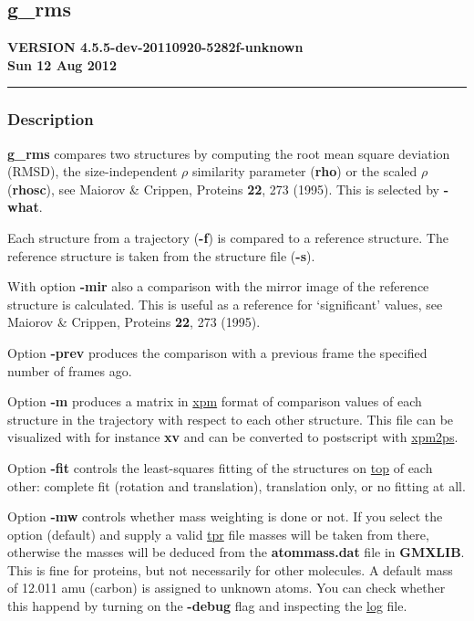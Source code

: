 \documentclass[]{article}
\author{}
\date{}
\begin{document}
\subsection{g\_rms}

\textbf{VERSION 4.5.5-dev-20110920-5282f-unknown\\ Sun 12 Aug 2012}

\begin{center}\rule{3in}{0.4pt}\end{center}

\subsubsection{Description}

\textbf{g\_rms} compares two structures by computing the root mean
square deviation (RMSD), the size-independent $\rho$ similarity
parameter (\textbf{rho}) or the scaled $\rho$ (\textbf{rhosc}), see
Maiorov \& Crippen, Proteins \textbf{22}, 273 (1995). This is selected
by \textbf{-what}.

Each structure from a trajectory (\textbf{-f}) is compared to a
reference structure. The reference structure is taken from the structure
file (\textbf{-s}).

With option \textbf{-mir} also a comparison with the mirror image of the
reference structure is calculated. This is useful as a reference for
`significant' values, see Maiorov \& Crippen, Proteins \textbf{22}, 273
(1995).

Option \textbf{-prev} produces the comparison with a previous frame the
specified number of frames ago.

Option \textbf{-m} produces a matrix in \hyperref[xpm]{xpm} format of
comparison values of each structure in the trajectory with respect to
each other structure. This file can be visualized with for instance
\textbf{xv} and can be converted to postscript with
\hyperref[xpm2ps]{xpm2ps}.

Option \textbf{-fit} controls the least-squares fitting of the
structures on \hyperref[top]{top} of each other: complete fit (rotation
and translation), translation only, or no fitting at all.

Option \textbf{-mw} controls whether mass weighting is done or not. If
you select the option (default) and supply a valid \hyperref[tpr]{tpr}
file masses will be taken from there, otherwise the masses will be
deduced from the \textbf{atommass.dat} file in \textbf{GMXLIB}. This is
fine for proteins, but not necessarily for other molecules. A default
mass of 12.011 amu (carbon) is assigned to unknown atoms. You can check
whether this happend by turning on the \textbf{-debug} flag and
inspecting the \hyperref[log]{log} file.
\end{document}
